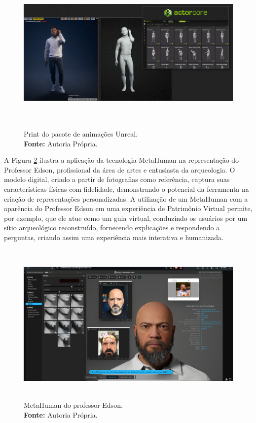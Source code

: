 \begin{figure}[H]
    \centering
    \includegraphics[height=8cm, keepaspectratio]{gif/animacoes/feature_body_motion-0000.jpg}
    \caption{ Print do pacote de animações Unreal.\\
        \textbf{Fonte:} Autoria Própria.}
    \label{fig:animacoes}
\end{figure}


A Figura \ref{fig:metahumanEdson} ilustra a aplicação da tecnologia MetaHuman na representação do Professor Edson, profissional da área de artes e entusiasta da arqueologia. O modelo digital, criado a partir de fotografias como referência, captura suas características físicas com fidelidade, demonstrando o potencial da ferramenta na criação de representações personalizadas. A utilização de um MetaHuman com a aparência do Professor Edson em uma experiência de Patrimônio Virtual permite, por exemplo, que ele atue como um guia virtual, conduzindo os usuários por um sítio arqueológico reconstruído, fornecendo explicações e respondendo a perguntas, criando assim uma experiência mais interativa e humanizada.

\begin{figure}[H]
    \centering
    \includegraphics[height=8cm, keepaspectratio]{img/Metahuman.png}
    \caption{MetaHuman do professor Edson. \\
        \textbf{Fonte:} Autoria Própria.}
    \label{fig:metahumanEdson}
\end{figure}

